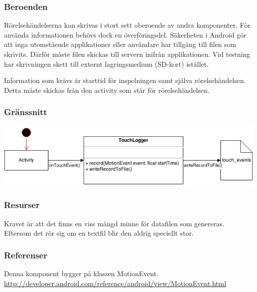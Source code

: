 \subsubsection{Beroenden}
Rörelsehändelserna kan skrivas i stort sett oberoende av andra komponenter. För använda informationen behövs dock en överföringsdel. Säkerheten i Android gör att inga utomstående applikationer eller användare har tillgång till filen som skrivits. Därför måste filen skickas till servern inifrån applikationen. Vid testning har skrivningen skett till externt lagringsmedium (SD-kort) istället.

Information som krävs är starttid för inspelningen samt själva rörelsehändelsen. Detta måste skickas från den activity som står för rörelsehändelsen.
\subsubsection{Gränssnitt}
\includegraphics[width=\linewidth]{TouchLogger.png}
\subsubsection{Resurser}
Kravet är att det finns en viss mängd minne för datafilen som genereras. Eftersom det rör sig om en textfil blir den aldrig speciellt stor.
\subsubsection{Referenser}
Denna komponent bygger på klassen MotionEvent.
\url{http://developer.android.com/reference/android/view/MotionEvent.html}
